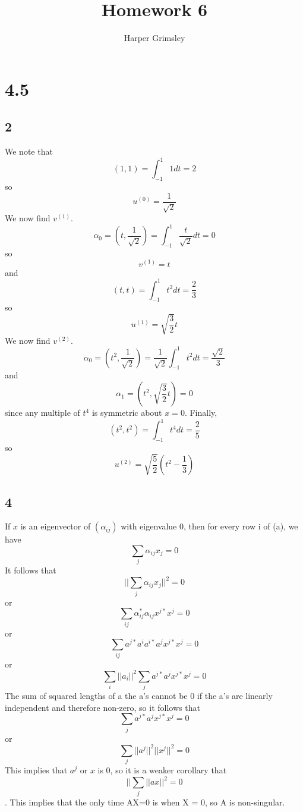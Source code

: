 \documentclass{article}
\title{Homework 6}
\author{Harper Grimsley}
\begin{document}
\maketitle
\section*{4.5}
\subsection*{2}
We note that
$$(1,1)=\int_{-1}^1 1dt = 2$$
so 
$$u^{(0)} = \frac{1}{\sqrt{2}}$$ 
We now find $v^{(1)}$.
$$\alpha_0 = (t, \frac{1}{\sqrt{2}}) = \int_{-1}^1 \frac{t}{\sqrt{2}}dt = 0$$
so 
$$v^{(1)}=t$$
and 
$$(t,t) = \int_{-1}^{1}{t^2}dt= \frac{2}{3}$$
so 
$$u^{(1)} = \sqrt{\frac{3}{2}}t$$
We now find $v^{(2)}$.
$$\alpha_0 = (t^2, \frac{1}{\sqrt{2}}) = \frac{1}{\sqrt{2}}\int_{-1}^1 t^2dt=\frac{\sqrt{2}}{3}$$
and
$$\alpha_1 = (t^2, \sqrt{\frac{3}{2}}t) = 0$$
since any multiple of $t^4$ is symmetric about $x=0$.  Finally,
$$(t^2,t^2) = \int_{-1}^1 t^4 dt = \frac{2}{5}$$
so 
$$u^{(2)}=\sqrt{\frac{5}{2}}({t^2}-\frac{1}{3})$$
\subsection*{4}
If $x$ is an eigenvector of $(\alpha_{ij})$ with eigenvalue 0, then for every row i of (a), we have 
$$\sum_j \alpha_{ij}x_j=0$$
It follows that
$$||\sum_j\alpha_{ij}x_j||^2=0$$
or
$$\sum_{ij}\alpha_{ij}^*\alpha_{ij}x^{j*}x^j=0$$
or
$$\sum_{ij}a^{j*}a^ia^{i*}a^jx^{j*}x^j=0$$
or
$$\sum_i{||a_i||^2}\sum_j a^{j*}a^jx^{j*}x^j=0$$
The sum of squared lengths of a the a's cannot be 0 if the a's are linearly independent and therefore non-zero, so it follows that
$$\sum_j a^{j*}a^jx^{j*}x^j=0$$
or
$$\sum_j ||a^j||^2||x^j||^2=0$$
This implies that $a^j$ or $x$ is 0, so it is a weaker corollary that 
$$||\sum_j ||ax||^2 = 0$$.  This implies that the only time AX=0 is when X = 0, so A is non-singular.
\end{document}
